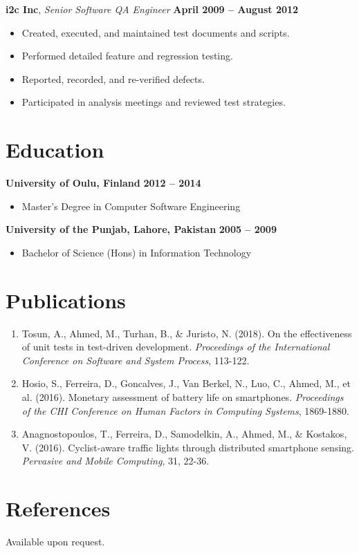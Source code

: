 \documentclass[12pt]{article}
\begin{document}
\textbf{i2c Inc}, \textit{Senior Software QA Engineer} \hfill \textbf{April 2009 – August 2012}
\begin{itemize}[leftmargin=1.5em]
    \item Created, executed, and maintained test documents and scripts.
    \item Performed detailed feature and regression testing.
    \item Reported, recorded, and re-verified defects.
    \item Participated in analysis meetings and reviewed test strategies.
\end{itemize}

\section*{Education}

\textbf{University of Oulu, Finland} \hfill \textbf{2012 – 2014}
\begin{itemize}[leftmargin=1.5em]
    \item Master's Degree in Computer Software Engineering
\end{itemize}

\textbf{University of the Punjab, Lahore, Pakistan} \hfill \textbf{2005 – 2009}
\begin{itemize}[leftmargin=1.5em]
    \item Bachelor of Science (Hons) in Information Technology
\end{itemize}

\section*{Publications}

\begin{enumerate}[leftmargin=1.5em]
    \item Tosun, A., Ahmed, M., Turhan, B., \& Juristo, N. (2018). On the effectiveness of unit tests in test-driven development. \textit{Proceedings of the International Conference on Software and System Process}, 113-122.
    \item Hosio, S., Ferreira, D., Goncalves, J., Van Berkel, N., Luo, C., Ahmed, M., et al. (2016). Monetary assessment of battery life on smartphones. \textit{Proceedings of the CHI Conference on Human Factors in Computing Systems}, 1869-1880.
    \item Anagnostopoulos, T., Ferreira, D., Samodelkin, A., Ahmed, M., \& Kostakos, V. (2016). Cyclist-aware traffic lights through distributed smartphone sensing. \textit{Pervasive and Mobile Computing}, 31, 22-36.
\end{enumerate}

\section*{References}

Available upon request.
\end{document}
